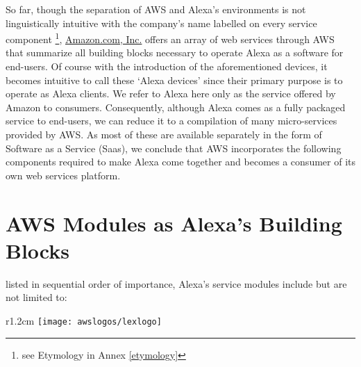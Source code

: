 So far, though the separation of AWS and Alexa's environments is not linguistically intuitive with the company's name labelled on every service component \footnote{see Etymology in Annex \ref{etymology}}, \href{http://www.amazon.com}{Amazon.com, Inc.} offers an array of web services through AWS that summarize all building blocks necessary to operate Alexa as a software for end-users. Of course with the introduction of the aforementioned devices, it becomes intuitive to call these `Alexa devices' since their primary purpose is to operate as Alexa clients. We refer to Alexa here only as the service offered by Amazon to consumers. Consequently, although Alexa comes as a fully packaged service to end-users, we can reduce it to a compilation of many micro-services provided by AWS. As most of these are available separately in the form of Software as a Service (Saas), we conclude that AWS incorporates the following components required to make Alexa come together and becomes a consumer of its own web services platform. 






\section{AWS Modules as Alexa's Building Blocks }
\label{aws:modules}

listed in sequential order of importance, Alexa's service modules include but are not limited to: 




%	
\begin{wrapfigure}[2]{r}{1.2cm}
	\texttt{[image: awslogos/lexlogo]}
\end{wrapfigure}
%


